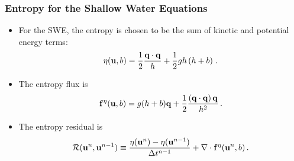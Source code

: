 \documentclass{beamer} \useoutertheme{infolines}
\begin{document}
\begin{frame}
\frametitle{Entropy for the Shallow Water Equations}

\begin{itemize}
  \item For the SWE, the entropy is chosen to be the sum of kinetic and
    potential energy terms:
    \begin{equation}
      \eta(\mathbf{u},b)
        = \frac{1}{2}\frac{\mathbf{q}\cdot\mathbf{q}}{h}
          + \frac{1}{2}gh\left(h+b\right)
      \,.
    \end{equation}
  \item The entropy flux is
    \begin{equation}
      \mathbf{f}^\eta(\mathbf{u},b)
        = g(h + b)\mathbf{q}
        + \frac{1}{2}\frac{\left(\mathbf{q}\cdot\mathbf{q}\right)\mathbf{q}} 
        {h^2}
      \,.
    \end{equation}
  \item The entropy residual is
    \begin{equation}
      \mathcal{R}(\mathbf{u}^n, \mathbf{u}^{n-1})
        \equiv \frac{\eta(\mathbf{u}^n)
        - \eta(\mathbf{u}^{n-1})}{\Delta t^{n-1}}
        + \nabla\cdot\mathbf{f}^\eta(\mathbf{u}^n,
          b)
      \,.
    \end{equation}
\end{itemize}

\end{frame}
\end{document}
